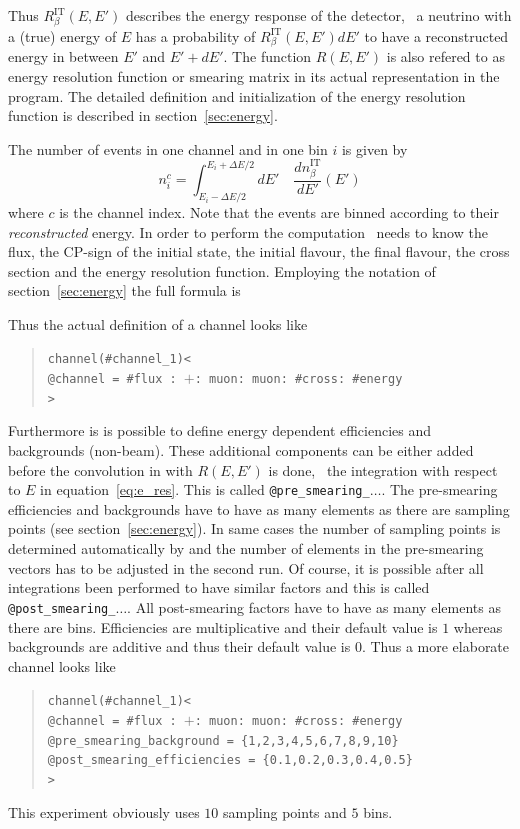 Thus $R_\beta^{\text{IT}}(E,E')$ describes the energy response of 
the detector, \ie\ a neutrino with a (true) energy of $E$ has a probability
of $R_\beta^{\text{IT}}(E,E') dE'$ to have a reconstructed energy 
in between $E'$ and $E'+dE'$. The function $R(E,E')$ is also refered to
as energy resolution function or smearing matrix in its actual representation
in the program. The detailed
definition and initialization of the energy resolution function is described
in section~\ref{sec:energy}.



The number of events in one channel and  in one bin $i$ is given by
\begin{equation}
\label{eq:channel}
n_i^c=\int_{E_i-\Delta E/2}^{E_i+\Delta E/2} dE' \quad
\frac{dn_{\beta}^{\text{IT}}}{dE'} (E')
\end{equation}
where $c$ is the channel index.
Note that the events are binned according to their \emph{reconstructed} energy.
In order to perform the computation \GLOBES\ needs to know the flux,
the CP-sign of the initial state, the initial flavour, the final flavour,
the cross section and the energy resolution function. Employing the notation
of section~\ref{sec:energy} the full formula is


Thus the actual definition of a channel looks like
\begin{quote}
{\tt channel(\#channel\_1)<\\
\tb @channel = \#flux : $+$: muon: muon: \#cross: \#energy\\
>}
\end{quote}
Furthermore is is possible to define energy dependent efficiencies and
backgrounds (non-beam). These additional components can be either added
before the convolution in with $R(E,E')$ is done, \ie\ the integration with
respect to $E$ in equation~\ref{eq:e_res}. This is called 
{\tt @pre\_smearing\_$\ldots$}. The pre-smearing efficiencies and backgrounds
have to have as many elements as there are sampling points 
(see section~\ref{sec:energy}). In same cases the number of sampling points
is determined automatically by \GLOBES and the number of elements in the 
pre-smearing vectors has to be adjusted in the second run.
Of course, it is possible after all
integrations been performed to have similar factors  and this is called  
{\tt @post\_smearing\_$\ldots$}. All post-smearing factors have to have as 
many elements as there are bins. Efficiencies are multiplicative and their
default value is $1$ whereas backgrounds are additive and thus their default
value is $0$. Thus a more elaborate channel looks like
\begin{quote}
{\tt channel(\#channel\_1)<\\
\tb @channel = \#flux : $+$: muon: muon: \#cross: \#energy\\
\tb @pre\_smearing\_background = \{1,2,3,4,5,6,7,8,9,10\}\\
\tb @post\_smearing\_efficiencies = \{0.1,0.2,0.3,0.4,0.5\}\\
>}
\end{quote}
This experiment obviously uses $10$ sampling points and $5$ bins.


